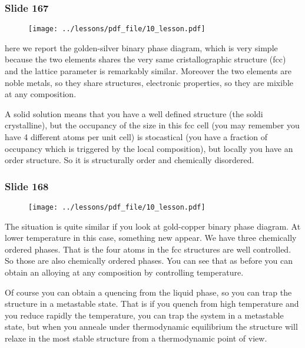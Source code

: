 \documentclass[../main/main.tex]{subfiles}
\begin{document}
\newpage

\subsubsection{Slide 167}

\begin{figure}[h!]
\centering
\texttt{[image: ../lessons/pdf\_file/10\_lesson.pdf]}
\end{figure}

here we report the golden-silver binary phase diagram, which is very simple because the two elements shares the very same cristallographic structure (fcc) and the lattice parameter is remarkably similar. Moreover the two elements are noble metals, so they share structures, electronic properties, so they are mixible at any composition.

A solid solution means that you have a well defined structure (the soldi crystalline), but the occupancy of the size in this fcc cell (you may remember you have 4 different atoms per unit cell) is stocastical (you have a fraction of occupancy which is triggered by the local composition), but locally you have an order structure. So it is structurally order and chemically disordered.

\newpage

\subsubsection{Slide 168}

\begin{figure}[h!]
\centering
\texttt{[image: ../lessons/pdf\_file/10\_lesson.pdf]}
\end{figure}

The situation is quite similar if you look at gold-copper binary phase diagram. At lower temperature in this case, something new appear. We have three chemically ordered phases.  That is the four atoms in the fcc structures are well controlled. So those are also chemically ordered phases.
You can see that as before you can obtain an alloying at any composition by controlling temperature.

Of course you can obtain a quencing from the liquid phase, so you can trap the structure in a metastable state. That is if you quench from high temperature and you reduce rapidly the temperature, you can trap the system in a metastable state, but when you anneale under thermodynamic equilibrium the structure will relaxe in the most stable structure from a thermodynamic point of view.
\end{document}
